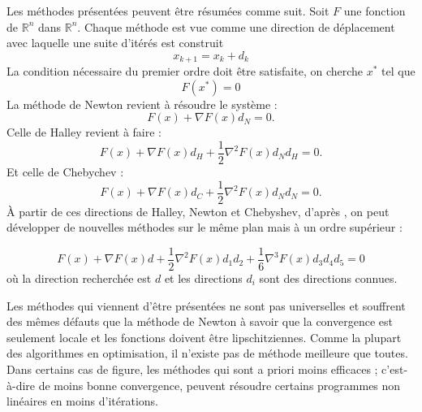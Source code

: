 Les m\'ethodes pr\'esent\'ees peuvent être r\'esum\'ees comme suit. Soit $F$ une fonction de $\mathbb{R}^n$
dans $\mathbb{R}^n$. Chaque m\'ethode est vue comme une direction de d\'eplacement avec laquelle une 
suite d'it\'er\'es est construit \[x_{k+1}=x_k+d_k\]
La condition n\'ecessaire du premier ordre doit être satisfaite, on cherche $x^*$ tel que 
\[F(x^*)=0\]
La m\'ethode de Newton revient \`a r\'esoudre le syst\`eme : 
\[F(x)+\nabla F(x)d_N=0.\]
Celle de Halley revient \`a faire : 
\[F(x)+\nabla F(x) d_H+\frac{1}{2} \nabla^2 F(x)d_N d_H=0.\]
Et celle de Chebychev :
\[F(x)+\nabla F(x) d_C+\frac{1}{2}\nabla^2 F(x)d_Nd_N=0.\]
%
%
\`A partir de ces directions de Halley, Newton et Chebyshev, d'apr\`es \cite{Kchouk}, on peut d\'evelopper de nouvelles m\'ethodes sur le même plan
mais \`a un ordre sup\'erieur : 

\begin{equation}
 F(x)+\nabla F(x)d+\frac{1}{2}\nabla^2 F(x){
d_1d_2}+\frac{1}{6}\nabla^3 F(x){
 d_3d_4d_5}=0
\label{eq:extra}
\end{equation}
o\`u la direction recherch\'ee est $d$ et les directions $d_i$ sont des directions connues.









Les m\'ethodes qui viennent d'être pr\'esent\'ees ne sont pas universelles et souffrent des 
mêmes d\'efauts que la m\'ethode de Newton \`a savoir que la convergence est seulement locale et les fonctions
doivent être lipschitziennes. Comme la plupart des algorithmes en optimisation, il
n'existe pas de m\'ethode meilleure que toutes. Dans certains cas de figure, les m\'ethodes qui sont a priori
moins efficaces ; c'est-\`a-dire de moins bonne convergence, peuvent r\'esoudre certains programmes non lin\'eaires en moins d'it\'erations.



